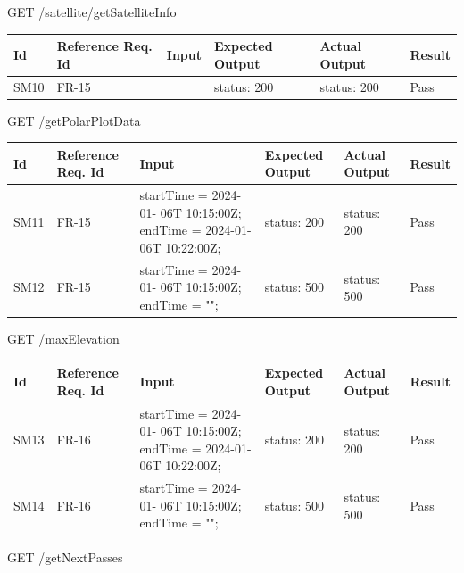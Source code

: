 \documentclass[12pt, titlepage]{article}
\begin{document}
GET /satellite/getSatelliteInfo

\begin{center}
\begin{tabular}{|p{1cm} | p{2cm} |p{2cm}| p{2cm} |p{2cm}| p{2cm}|}
\hline
\textbf{Id} & \textbf{Reference Req. Id} & \textbf{Input} & \textbf{Expected Output} & \textbf{Actual Output} & \textbf{Result} \\
\hline
SM10 & FR-15 & {  } & { status: 200 } & { status: 200 } & Pass
\\
\hline
\end{tabular}

\end{center}

GET /getPolarPlotData

\begin{center}
\begin{tabular}{|p{1cm} | p{2cm} |p{2cm}| p{2cm} |p{2cm}| p{2cm}|}
\hline
\textbf{Id} & \textbf{Reference Req. Id} & \textbf{Input} & \textbf{Expected Output} & \textbf{Actual Output} & \textbf{Result} \\
\hline
SM11 & FR-15 & { startTime = 2024-01- 06T 10:15:00Z;
    endTime = 2024-01- 06T 10:22:00Z;} & { status: 200 } & { status: 200 } & Pass
\\
\hline
SM12 & FR-15 & { startTime = 2024-01- 06T 10:15:00Z;
    endTime = "";} & { status: 500 } & { status: 500 } & Pass
\\
\hline

\end{tabular}

\end{center}
GET /maxElevation

\begin{center}
\begin{tabular}{|p{1cm} | p{2cm} |p{2cm}| p{2cm} |p{2cm}| p{2cm}|}
\hline
\textbf{Id} & \textbf{Reference Req. Id} & \textbf{Input} & \textbf{Expected Output} & \textbf{Actual Output} & \textbf{Result} \\
\hline
SM13 & FR-16 & { startTime = 2024-01- 06T 10:15:00Z;
    endTime = 2024-01- 06T 10:22:00Z;} & { status: 200 } & { status: 200 } & Pass
\\
\hline
SM14 & FR-16 & { startTime = 2024-01- 06T 10:15:00Z;
    endTime = "";} & { status: 500 } & { status: 500 } & Pass
\\
\hline

\end{tabular}

\end{center}
GET /getNextPasses
\end{document}

